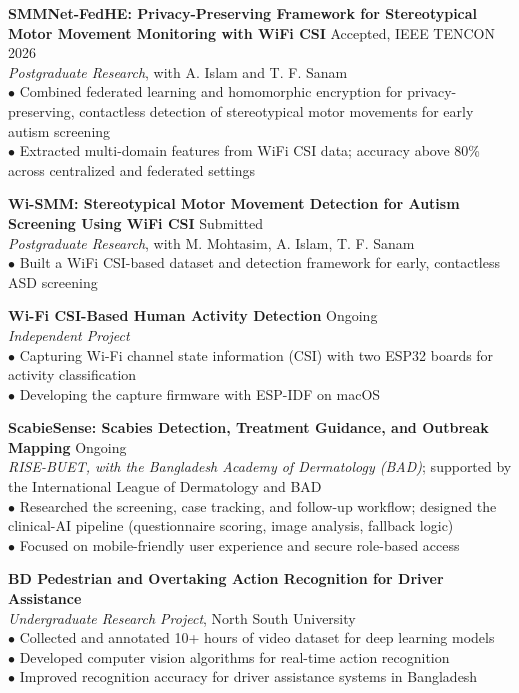 \documentclass[11pt,a4paper]{article}
\begin{document}
\vspace{3pt}
\noindent\textbf{SMMNet-FedHE: Privacy-Preserving Framework for Stereotypical Motor Movement Monitoring with WiFi CSI} \hfill Accepted, IEEE TENCON 2026\\
\textit{Postgraduate Research}, with A. Islam and T. F. Sanam\\
$\bullet$ Combined federated learning and homomorphic encryption for privacy-preserving, contactless detection of stereotypical motor movements for early autism screening\\
$\bullet$ Extracted multi-domain features from WiFi CSI data; accuracy above 80\% across centralized and federated settings

\vspace{3pt}
\noindent\textbf{Wi-SMM: Stereotypical Motor Movement Detection for Autism Screening Using WiFi CSI} \hfill Submitted\\
\textit{Postgraduate Research}, with M. Mohtasim, A. Islam, T. F. Sanam\\
$\bullet$ Built a WiFi CSI-based dataset and detection framework for early, contactless ASD screening

\vspace{3pt}
\noindent\textbf{Wi-Fi CSI-Based Human Activity Detection} \hfill Ongoing\\
\textit{Independent Project}\\
$\bullet$ Capturing Wi-Fi channel state information (CSI) with two ESP32 boards for activity classification\\
$\bullet$ Developing the capture firmware with ESP-IDF on macOS

\vspace{3pt}
\noindent\textbf{ScabieSense: Scabies Detection, Treatment Guidance, and Outbreak Mapping} \hfill Ongoing\\
\textit{RISE-BUET, with the Bangladesh Academy of Dermatology (BAD)}; supported by the International League of Dermatology and BAD\\
$\bullet$ Researched the screening, case tracking, and follow-up workflow; designed the clinical-AI pipeline (questionnaire scoring, image analysis, fallback logic)\\
$\bullet$ Focused on mobile-friendly user experience and secure role-based access

\vspace{3pt}
\noindent\textbf{BD Pedestrian and Overtaking Action Recognition for Driver Assistance}\\
\textit{Undergraduate Research Project}, North South University\\
$\bullet$ Collected and annotated 10+ hours of video dataset for deep learning models\\
$\bullet$ Developed computer vision algorithms for real-time action recognition\\
$\bullet$ Improved recognition accuracy for driver assistance systems in Bangladesh
\end{document}
